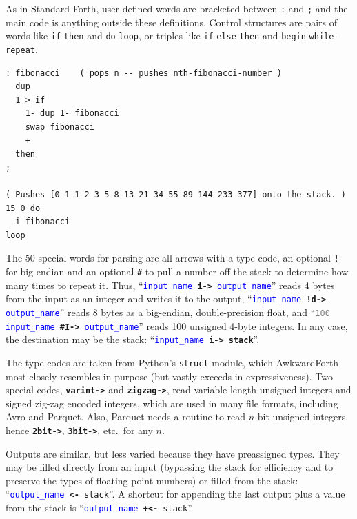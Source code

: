 \documentclass{webofc}
\begin{document}
As in Standard Forth, user-defined words are bracketed between \texttt{:} and \texttt{;} and the main code is anything outside these definitions. Control structures are pairs of words like \texttt{if}-\texttt{then} and \texttt{do}-\texttt{loop}, or triples like \texttt{if}-\texttt{else}-\texttt{then} and \texttt{begin}-\texttt{while}-\texttt{repeat}.

\begin{verbatim}
: fibonacci    ( pops n -- pushes nth-fibonacci-number )
  dup
  1 > if
    1- dup 1- fibonacci
    swap fibonacci
    +
  then
;

( Pushes [0 1 1 2 3 5 8 13 21 34 55 89 144 233 377] onto the stack. )
15 0 do
  i fibonacci
loop
\end{verbatim}

The 50 special words for parsing are all arrows with a type code, an optional \textcolor{OliveGreen}{\tt\textbf{!}} for big-endian and an optional \textcolor{OliveGreen}{\tt\textbf{\#}} to pull a number off the stack to determine how many times to repeat it. Thus, ``{\tt \textcolor{blue}{input\_name} \textcolor{OliveGreen}{\textbf{i->}} \textcolor{blue}{output\_name}}'' reads 4 bytes from the input as an integer and writes it to the output, ``{\tt \textcolor{blue}{input\_name} \textcolor{OliveGreen}{\textbf{!d->}} \textcolor{blue}{output\_name}}'' reads 8 bytes as a big-endian, double-precision float, and ``{\tt \textcolor{gray}{100} \textcolor{blue}{input\_name} \textcolor{OliveGreen}{\textbf{\#I->}} \textcolor{blue}{output\_name}}'' reads 100 unsigned 4-byte integers. In any case, the destination may be the stack: ``{\tt \textcolor{blue}{input\_name} \textcolor{OliveGreen}{\textbf{i->}} \textcolor{OliveGreen}{\textbf{stack}}}''.

The type codes are taken from Python's \texttt{struct} module, which AwkwardForth most closely resembles in purpose (but vastly exceeds in expressiveness). Two special codes, \textcolor{OliveGreen}{\tt\textbf{varint->}} and \textcolor{OliveGreen}{\tt\textbf{zigzag->}}, read variable-length unsigned integers and signed zig-zag encoded integers, which are used in many file formats, including Avro and Parquet. Also, Parquet needs a routine to read $n$-bit unsigned integers, hence \textcolor{OliveGreen}{\tt\textbf{2bit->}}, \textcolor{OliveGreen}{\tt\textbf{3bit->}}, etc.\ for any $n$.

Outputs are similar, but less varied because they have preassigned types. They may be filled directly from an input (bypassing the stack for efficiency and to preserve the types of floating point numbers) or filled from the stack: ``{\tt \textcolor{blue}{output\_name} \textcolor{OliveGreen}{\textbf{<-}} \textcolor{OliveGreen}{stack}}''. A shortcut for appending the last output plus a value from the stack is ``{\tt \textcolor{blue}{output\_name} \textcolor{OliveGreen}{\textbf{+<-}} \textcolor{OliveGreen}{stack}}''.
\end{document}
